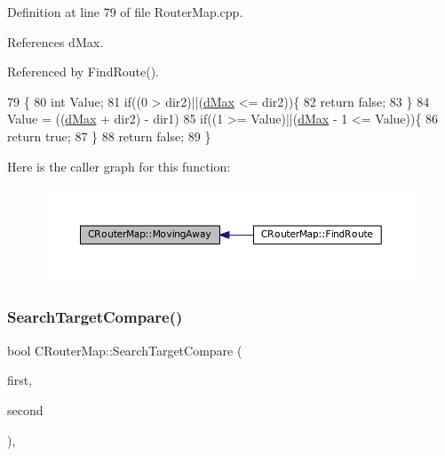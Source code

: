 Definition at line 79 of file Router\+Map.\+cpp.



References d\+Max.



Referenced by Find\+Route().


\begin{DoxyCode}
79                                                            \{
80     \textcolor{keywordtype}{int} Value;
81     \textcolor{keywordflow}{if}((0 > dir2)||(\hyperlink{GameDataTypes_8h_acb2b033915f6659a71a38b5aa6e4eb42af6546049275557ce0ade2ceee042a319}{dMax} <= dir2))\{
82         \textcolor{keywordflow}{return} \textcolor{keyword}{false};    
83     \}
84     Value = ((\hyperlink{GameDataTypes_8h_acb2b033915f6659a71a38b5aa6e4eb42af6546049275557ce0ade2ceee042a319}{dMax} + dir2) - dir1) %
85     \textcolor{keywordflow}{if}((1 >= Value)||(\hyperlink{GameDataTypes_8h_acb2b033915f6659a71a38b5aa6e4eb42af6546049275557ce0ade2ceee042a319}{dMax} - 1 <= Value))\{
86         \textcolor{keywordflow}{return} \textcolor{keyword}{true};   
87     \}
88     \textcolor{keywordflow}{return} \textcolor{keyword}{false};
89 \}
\end{DoxyCode}
Here is the caller graph for this function\+:\nopagebreak
\begin{figure}[H]
\begin{center}
\leavevmode
\includegraphics[width=350pt]{classCRouterMap_adf9041b4e1face1308c556c0ba0de9af_icgraph}
\end{center}
\end{figure}
\hypertarget{classCRouterMap_a1a581c85a34b6d0fcc5ddc3d0ae7fb00}{}\label{classCRouterMap_a1a581c85a34b6d0fcc5ddc3d0ae7fb00} 
\subsubsection{\texorpdfstring{Search\+Target\+Compare()}{SearchTargetCompare()}}
{\footnotesize\ttfamily bool C\+Router\+Map\+::\+Search\+Target\+Compare (\begin{DoxyParamCaption}\item[{const \hyperlink{structCRouterMap_1_1SSearchTarget}{S\+Search\+Target} \&}]{first,  }\item[{const \hyperlink{structCRouterMap_1_1SSearchTarget}{S\+Search\+Target} \&}]{second }\end{DoxyParamCaption})\hspace{0.3cm}{\ttfamily [static]}, {\ttfamily [protected]}}




